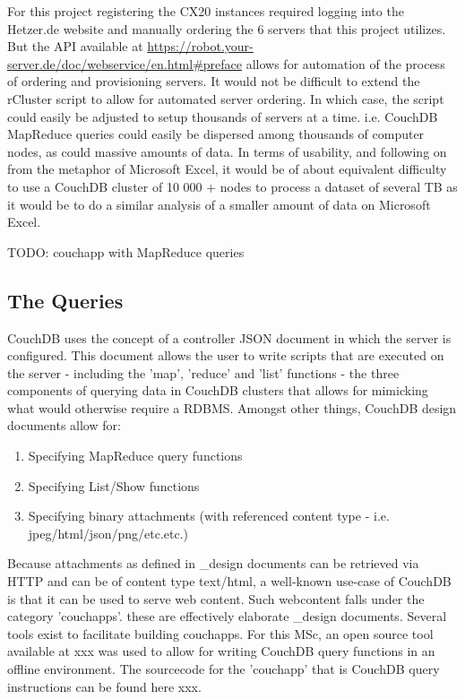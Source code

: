 For this project registering the CX20 instances required logging into the Hetzer.de website and manually ordering the 6 servers that this project utilizes. But the API available at \url{https://robot.your-server.de/doc/webservice/en.html#preface} allows for automation of the process of ordering and provisioning servers. It would not be difficult to extend the rCluster script to allow for automated server ordering. In which case, the script could easily be adjusted to setup thousands of servers at a time. i.e. CouchDB MapReduce queries could easily be dispersed among thousands of computer nodes, as could massive amounts of data. In terms of usability, and following on from the metaphor of Microsoft Excel, it would be of about equivalent difficulty to use a CouchDB cluster of 10 000 + nodes to process a dataset of several TB as it would be to do a similar analysis of a smaller amount of data on Microsoft Excel.

TODO: couchapp with MapReduce queries

\subsection{The Queries}

CouchDB uses the concept of a controller JSON document in which the server is configured. This document allows the user to write scripts that are executed on the server - including the 'map', 'reduce' and 'list' functions - the three components of querying data in CouchDB clusters that allows for mimicking what would otherwise require a RDBMS. Amongst other things, CouchDB design documents allow for:

\begin{enumerate}
    \item Specifying MapReduce query functions
    \item Specifying List/Show functions
    \item Specifying binary attachments (with referenced content type - i.e. jpeg/html/json/png/etc.etc.)
\end{enumerate}

Because attachments as defined in \_design documents can be retrieved via HTTP and can be of content type text/html, a well-known use-case of CouchDB is that it can be used to serve web content. Such webcontent falls under the category 'couchapps'. these are effectively elaborate \_design documents. Several tools exist to facilitate building couchapps. For this MSc, an open source tool available at xxx was used to allow for writing CouchDB query functions in an offline environment. The sourcecode for the 'couchapp' that is CouchDB query instructions can be found here xxx.